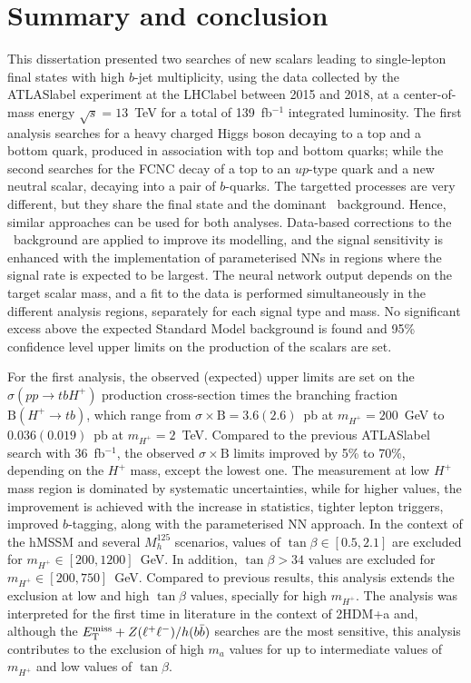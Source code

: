 \chapter{Summary and conclusion}

This dissertation presented two searches of new scalars leading to single-lepton final states with high $b$-jet multiplicity, using the data collected by the \acrshort{ATLASlabel} experiment at the \acrshort{LHClabel} between 2015 and 2018, at a center-of-mass energy $\sqrt{s}=13$~TeV for a total of 139~fb$^{-1}$ integrated luminosity. The first analysis searches for a heavy charged Higgs boson decaying to a top and a bottom quark, produced in association with top and bottom quarks; while the second searches for the FCNC decay of a top to an $up$-type quark and a new neutral scalar, decaying into a pair of $b$-quarks. The targetted processes are very different, but they share the final state and the dominant \ttjets\ background. Hence, similar approaches can be used for both analyses. Data-based corrections to the \ttbar\ background are applied to improve its modelling, and the signal sensitivity is enhanced with the implementation of parameterised NNs in regions where the signal rate is expected to be largest. The neural network output depends on the target scalar mass, and a fit to the data is performed simultaneously in the different analysis regions, separately for each signal type and mass. No significant excess above the expected Standard Model background is found and 95\% confidence level upper limits on the production of the scalars are set.

For the first analysis, the observed (expected) upper limits are set on the $\sigma(pp\to tb H^+)$ production cross-section times the branching fraction $\text{B}(H^+\to tb)$, which range from $\sigma\times\text{B}=3.6(2.6)$~pb at $m_{H^+}=200$~GeV to $0.036(0.019)$~pb at $m_{H^+}=2$~TeV. Compared to the previous \acrshort{ATLASlabel} search with 36~fb$^{-1}$, the observed $\sigma\times\text{B}$ limits improved by 5\% to 70\%, depending on the $H^+$ mass, except the lowest one. The measurement at low $H^+$ mass region is dominated by systematic uncertainties, while for higher values, the improvement is achieved with the increase in statistics, tighter lepton triggers, improved $b$-tagging, along with the parameterised NN approach. In the context of the hMSSM and several $M_{h}^{125}$ scenarios, values of $\tan\beta\in[0.5,2.1]$ are excluded for $m_{H^+}\in[200,1200]$~GeV. In addition, $\tan\beta>34$ values are excluded for $m_{H^+}\in[200,750]$~GeV. Compared to previous results, this analysis extends the exclusion at low and high $\tan\beta$ values, specially for high $m_{H^+}$. The analysis was interpreted for the first time in literature in the context of 2HDM+a and, although the $E_{\text{T}}^{\text{miss}}+Z(\ell^+\ell^-)/h(b\bar{b})$ searches are the most sensitive, this analysis contributes to the exclusion of high $m_a$ values for up to intermediate values of $m_{H^+}$ and low values of $\tan\beta$.

